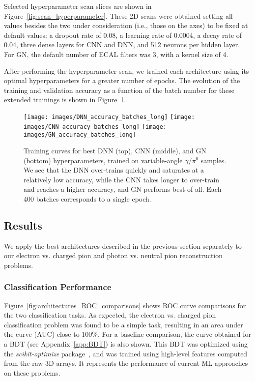 Selected hyperparameter scan slices are shown in Figure~\ref{fig:scan_hyperparameter}. 
These 2D scans were obtained setting all values besides the two under consideration (i.e., those on the axes) to be fixed at default values: a dropout rate of 0.08, a learning rate of 0.0004, a decay rate of 0.04, three dense layers for CNN and DNN, and 512 neurons per hidden layer. For GN, the default number of ECAL filters was 3, with a kernel size of 4.

After performing the hyperparameter scan, we trained each architecture using its optimal hyperparameters for a greater number of epochs. The evolution of the training and validation accuracy as a function of the batch number for these extended trainings is shown in Figure~\ref{fig:training_curves_comparison_gamma_pi0}.

\begin{figure}[htbp]
\centering
\texttt{[image: images/DNN\_accuracy\_batches\_long]}
\texttt{[image: images/CNN\_accuracy\_batches\_long]}
\texttt{[image: images/GN\_accuracy\_batches\_long]}
\caption{Training curves for best DNN (top), CNN (middle), and GN (bottom) hyperparameters, trained on variable-angle $\gamma$/$\pi^0$ samples. We see that the DNN over-trains quickly and saturates at a relatively low accuracy, while the CNN takes longer to over-train and reaches a higher accuracy, and GN performs best of all. Each 400 batches corresponds to a single epoch.}
\label{fig:training_curves_comparison_gamma_pi0}
\end{figure}

\subsection{Results}

We apply the best architectures described in the previous section separately to our electron vs. charged pion and photon vs. neutral pion reconstruction problems.

\subsubsection{Classification Performance}
\label{sec:classification}

Figure~\ref{fig:architectures_ROC_comparisons} shows ROC curve comparisons for the two classification tasks. As expected, the electron vs. charged pion classification problem was found to be a simple task, resulting in an area under the curve (AUC) close to $100\%$. For a baseline comparison, the curve obtained for a BDT (see Appendix~\ref{app:BDT}) is also shown. This BDT was optimized using the {\it scikit-optimize} package~\cite{skopt}, and was trained using high-level features computed from the raw 3D arrays. It represents the performance of current ML approaches on these problems.

